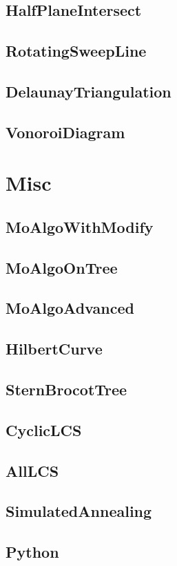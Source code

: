 	\subsection{HalfPlaneIntersect}
	
	\subsection{RotatingSweepLine}
	
	\subsection{DelaunayTriangulation}
	
	\subsection{VonoroiDiagram}
	
\section{Misc}
	\subsection{MoAlgoWithModify}
	
	\subsection{MoAlgoOnTree}
	
	\subsection{MoAlgoAdvanced}
	
	\subsection{HilbertCurve}
	
	\subsection{SternBrocotTree}
	
	\subsection{CyclicLCS}
	
	\subsection{AllLCS}
	
	\subsection{SimulatedAnnealing}
	
	\subsection{Python}
	
